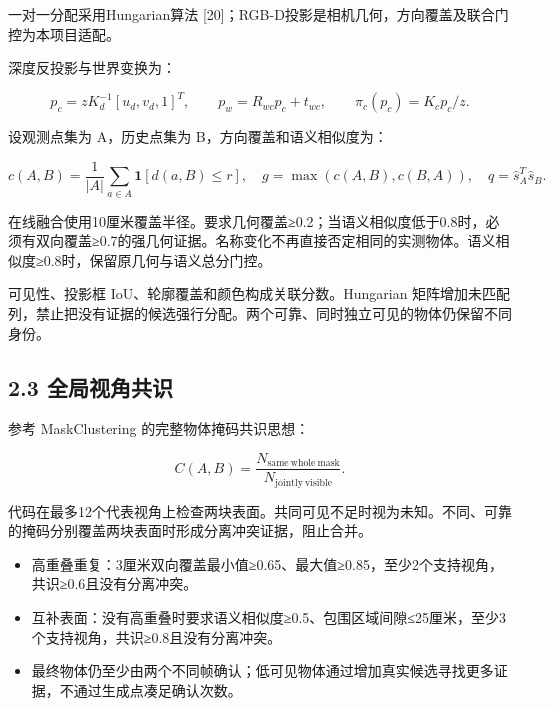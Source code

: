 \documentclass[UTF8,fontset=fandol]{ctexart}
\begin{document}
一对一分配采用Hungarian算法 [20]；RGB-D投影是相机几何，方向覆盖及联合门控为本项目适配。



深度反投影与世界变换为：



\[
p_c=zK_d^{-1}[u_d,v_d,1]^T,\qquad p_w=R_{wc}p_c+t_{wc},\qquad \pi_c(p_c)=K_cp_c/z.
\]

设观测点集为 A，历史点集为 B，方向覆盖和语义相似度为：



\[
c(A,B)=\frac{1}{|A|}\sum_{a\in A}\mathbf1[d(a,B)\le r],\quad
g=\max(c(A,B),c(B,A)),\quad q=\hat s_A^T\hat s_B.
\]

在线融合使用10厘米覆盖半径。要求几何覆盖≥0.2；当语义相似度低于0.8时，必须有双向覆盖≥0.7的强几何证据。名称变化不再直接否定相同的实测物体。语义相似度≥0.8时，保留原几何与语义总分门控。



可见性、投影框 IoU、轮廓覆盖和颜色构成关联分数。Hungarian 矩阵增加未匹配列，禁止把没有证据的候选强行分配。两个可靠、同时独立可见的物体仍保留不同身份。



\subsection*{2.3 全局视角共识}

参考 MaskClustering 的完整物体掩码共识思想：



\[
C(A,B)=\frac{N_{\mathrm{same\ whole\ mask}}}{N_{\mathrm{jointly\ visible}}}.
\]

代码在最多12个代表视角上检查两块表面。共同可见不足时视为未知。不同、可靠的掩码分别覆盖两块表面时形成分离冲突证据，阻止合并。



\begin{itemize}
\item 高重叠重复：3厘米双向覆盖最小值≥0.65、最大值≥0.85，至少2个支持视角，共识≥0.6且没有分离冲突。


\item 互补表面：没有高重叠时要求语义相似度≥0.5、包围区域间隙≤25厘米，至少3个支持视角，共识≥0.8且没有分离冲突。


\item 最终物体仍至少由两个不同帧确认；低可见物体通过增加真实候选寻找更多证据，不通过生成点凑足确认次数。

\end{itemize}
\end{document}

